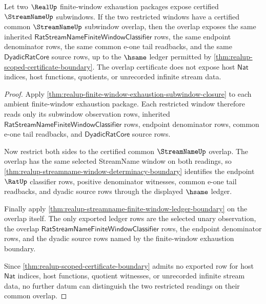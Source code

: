 \begin{theorem}
\label{thm:realup-finite-window-exhaustion-overlap-closure}
Let two $\RealUp$ finite-window exhaustion packages expose certified
$\StreamNameUp$ subwindows. If the two restricted windows have a certified
common $\StreamNameUp$ subwindow overlap, then the overlap exposes the same
inherited $\mathsf{RatStreamNameFiniteWindowClassifier}$ rows, the same
endpoint denominator rows, the same common e-one tail readbacks, and the same
$\mathsf{DyadicRatCore}$ source rows, up to the $\hsame$ ledger permitted by
\autoref{thm:realup-scoped-certificate-boundary}. The overlap certificate
does not expose host $\mathsf{Nat}$ indices, host functions, quotients, or
unrecorded infinite stream data.
\end{theorem}
\begin{proof}
Apply
\autoref{thm:realup-finite-window-exhaustion-subwindow-closure} to each
ambient finite-window exhaustion package. Each restricted window therefore
reads only its subwindow observation rows, inherited
$\mathsf{RatStreamNameFiniteWindowClassifier}$ rows, endpoint denominator
rows, common e-one tail readbacks, and $\mathsf{DyadicRatCore}$ source rows.

Now restrict both sides to the certified common $\StreamNameUp$ overlap. The
overlap has the same selected StreamName window on both readings, so
\autoref{thm:realup-streamname-window-determinacy-boundary} identifies the
endpoint $\RatUp$ classifier rows, positive denominator witnesses, common
e-one tail readbacks, and dyadic source rows through the displayed $\hsame$
ledger.

Finally apply
\autoref{thm:realup-streamname-finite-window-ledger-boundary} on the overlap
itself. The only exported ledger rows are the selected unary observation, the
overlap $\mathsf{RatStreamNameFiniteWindowClassifier}$ rows, the endpoint
denominator rows, and the dyadic source rows named by the finite-window
exhaustion boundary.

Since \autoref{thm:realup-scoped-certificate-boundary} admits no exported row
for host $\mathsf{Nat}$ indices, host functions, quotient witnesses, or
unrecorded infinite stream data, no further datum can distinguish the two
restricted readings on their common overlap.
\end{proof}

